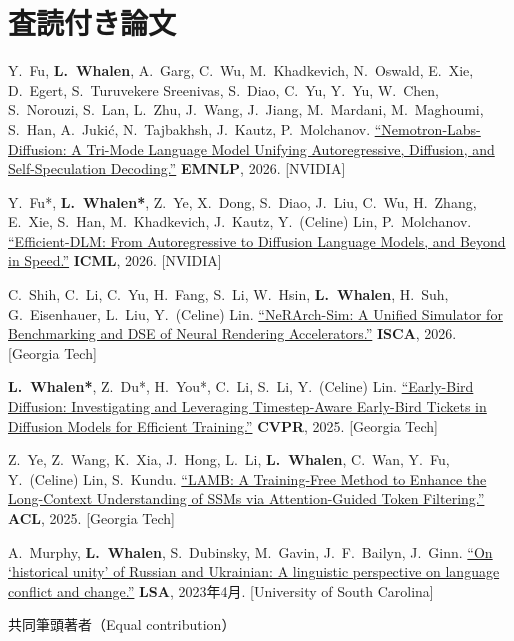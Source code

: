 \documentclass[10pt,a4paper]{article}
\begin{document}
\section{査読付き論文}
\begin{publist}
  \item Y.\ Fu, \textbf{L.\ Whalen}, A.\ Garg, C.\ Wu, M.\ Khadkevich, N.\ Oswald, E.\ Xie, D.\ Egert, S.\ Turuvekere Sreenivas, S.\ Diao, C.\ Yu, Y.\ Yu, W.\ Chen, S.\ Norouzi, S.\ Lan, L.\ Zhu, J.\ Wang, J.\ Jiang, M.\ Mardani, M.\ Maghoumi, S.\ Han, A.\ Juki\'{c}, N.\ Tajbakhsh, J.\ Kautz, P.\ Molchanov. \href{https://arxiv.org/pdf/2607.05722}{``Nemotron-Labs-Diffusion: A Tri-Mode Language Model Unifying Autoregressive, Diffusion, and Self-Speculation Decoding.''} \textbf{EMNLP}, 2026. [NVIDIA]

  \item Y.\ Fu*, \textbf{L.\ Whalen*}, Z.\ Ye, X.\ Dong, S.\ Diao, J.\ Liu, C.\ Wu, H.\ Zhang, E.\ Xie, S.\ Han, M.\ Khadkevich, J.\ Kautz, Y.\ (Celine) Lin, P.\ Molchanov. \href{https://arxiv.org/pdf/2512.14067}{``Efficient-DLM: From Autoregressive to Diffusion Language Models, and Beyond in Speed.''} \textbf{ICML}, 2026. [NVIDIA]

  \item C.\ Shih, C.\ Li, C.\ Yu, H.\ Fang, S.\ Li, W.\ Hsin, \textbf{L.\ Whalen}, H.\ Suh, G.\ Eisenhauer, L.\ Liu, Y.\ (Celine) Lin. \href{https://ieeexplore.ieee.org/abstract/document/11617858}{``NeRArch-Sim: A Unified Simulator for Benchmarking and DSE of Neural Rendering Accelerators.''} \textbf{ISCA}, 2026. [Georgia Tech]

  \item \textbf{L.\ Whalen*}, Z.\ Du*, H.\ You*, C.\ Li, S.\ Li, Y.\ (Celine) Lin. \href{https://openaccess.thecvf.com/content/CVPR2025/html/Whalen_Early-Bird_Diffusion_Investigating_and_Leveraging_Timestep-Aware_Early-Bird_Tickets_in_Diffusion_CVPR_2025_paper.html}{``Early-Bird Diffusion: Investigating and Leveraging Timestep-Aware Early-Bird Tickets in Diffusion Models for Efficient Training.''} \textbf{CVPR}, 2025. [Georgia Tech]

  \item Z.\ Ye, Z.\ Wang, K.\ Xia, J.\ Hong, L.\ Li, \textbf{L.\ Whalen}, C.\ Wan, Y.\ Fu, Y.\ (Celine) Lin, S.\ Kundu. \href{https://aclanthology.org/2025.acl-short.96.pdf}{``LAMB: A Training-Free Method to Enhance the Long-Context Understanding of SSMs via Attention-Guided Token Filtering.''} \textbf{ACL}, 2025. [Georgia Tech]

  \item A.\ Murphy, \textbf{L.\ Whalen}, S.\ Dubinsky, M.\ Gavin, J.\ F.\ Bailyn, J.\ Ginn. \href{https://journals.linguisticsociety.org/proceedings/index.php/PLSA/article/view/5467}{``On `historical unity' of Russian and Ukrainian: A linguistic perspective on language conflict and change.''} \textbf{LSA}, 2023年4月. [University of South Carolina]
\end{publist}
{\footnotesize * 共同筆頭著者（Equal contribution）}
\end{document}
